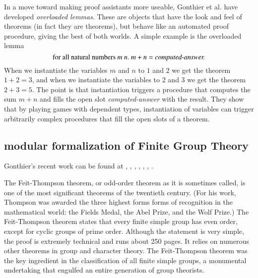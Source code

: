 \documentclass{llncs}
\begin{document}
In a move toward making proof assistants more useable, Gonthier et al.
have developed {\it overloaded lemmas}.  These are objects that have
the look and feel of theorems (in fact they are theorems), but behave
like an automated proof procedure, giving the best of both worlds.
A simple example is the overloaded lemma
\[
\text{for all natural numbers}~m~n.~m+n  = \text{\it computed-answer.}
\]
When we instantiate the variables $m$ and $n$ to $1$ and $2$ we get
the theorem $1+2=3$, and when we instantiate the variables to $2$ and
$3$ we get the theorem $2+3=5$.  The point is that instantiation
triggers a procedure that computes the sum $m+n$ and fills the open
slot {\it computed-answer} with the result.  They show that by playing
games with dependent types,
instantiation of variables can trigger arbitrarily complex procedures
that fill the open slots of a theorem.



\subsection{modular formalization of Finite Group Theory}

Gonthier's recent work can be found at
\cite{gonSSRE}, \cite{gonPFSF}, \cite{gonPMS}, \cite{gonMF},
\cite{gonHoc}, \cite{gonISSR}, \cite{gonC}.

The Feit-Thompson theorem, or odd-order theorem as it is sometimes
called, is one of the most significant theorems of the twentieth
century.  (For his work, Thompson was awarded the three highest forms
forms of recognition in the mathematical world: the Fields Medal, the
Abel Prize, and the Wolf Prize.)  The Feit-Thompson theorem states
that every finite simple group has even order, except for cyclic
groups of prime order.  Although the statement is very simple, the
proof is extremely technical and runs about 250 pages. It relies on
numerous other theorems in group and character theory.  The
Feit-Thompson theorem was the key ingredient in the classification of
all finite simple groups, a monumental undertaking that engulfed an
entire generation of group theorists.


\end{document}

